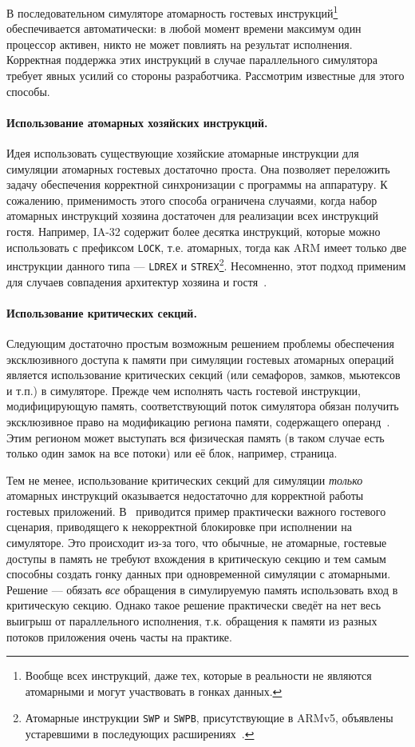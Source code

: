 В последовательном симуляторе атомарность гостевых инструкций\footnote{Вообще всех инструкций, даже тех, которые в реальности не являются атомарными и могут участвовать в гонках данных.} обеспечивается автоматически: в любой момент времени максимум один процессор активен, никто не может повлиять на результат исполнения. Корректная поддержка этих инструкций в случае параллельного симулятора требует явных усилий со стороны разработчика. Рассмотрим известные для этого способы.

\paragraph{Использование атомарных хозяйских инструкций.} Идея использовать существующие хозяйские атомарные инструкции для симуляции атомарных гостевых достаточно проста. Она позволяет переложить задачу обеспечения корректной синхронизации с программы на аппаратуру. К сожалению, применимость этого способа ограничена случаями, когда набор атомарных инструкций хозяина достаточен для реализации всех инструкций гостя. Например, IA-32 содержит более десятка инструкций, которые можно использовать с префиксом \texttt{LOCK}, т.е. атомарных, тогда как ARM имеет только две инструкции данного типа --- \texttt{LDREX} и \texttt{STREX}\footnote{Атомарные инструкции \texttt{SWP} и \texttt{SWPB}, присутствующие в ARMv5, объявлены устаревшими в последующих расширениях~\cite{arm-atomics}.}. Несомненно, этот подход применим для случаев совпадения архитектур хозяина и гостя~\cite{lantz-thesis}.

\paragraph{Использование критических секций.} Следующим достаточно простым возможным решением проблемы обеспечения эксклюзивного доступа к памяти при симуляции гостевых атомарных операций является использование критических секций (или семафоров, замков, мьютексов и т.п.) в симуляторе. Прежде чем исполнять часть гостевой инструкции, модифицирующую память, соответствующий поток симулятора обязан получить эксклюзивное право на модификацию региона памяти, содержащего операнд~\cite{pqemu2001}. Этим регионом может выступать вся физическая память (в таком случае есть только один замок на все потоки) или её блок, например, страница.

Тем не менее, использование критических секций для симуляции \emph{только} атомарных инструкций оказывается недостаточно для корректной работы гостевых приложений. В~\cite{coremu} приводится пример практически важного гостевого сценария, приводящего к некорректной блокировке при исполнении на симуляторе. Это происходит из-за того, что обычные, не атомарные, гостевые доступы в память не требуют вхождения в критическую секцию и тем самым способны создать гонку данных при одновременной симуляции с атомарными. Решение --- обязать \emph{все} обращения в симулируемую память использовать вход в критическую секцию. Однако такое решение практически сведёт на нет весь выигрыш от параллельного исполнения, т.к. обращения к памяти из разных потоков приложения очень часты на практике.

